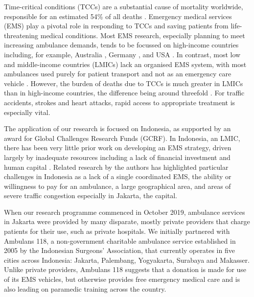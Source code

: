 \documentclass[preprint,12pt]{elsarticle}
\begin{document}
Time-critical conditions (TCCs) are a substantial cause of mortality worldwide,
responsible for an estimated 54\% of all deaths \cite{FraserBMJ}. Emergency
medical services (EMS) play a pivotal role in responding to TCCs and saving
patients from life-threatening medical conditions. Most EMS research, especially
planning to meet increasing ambulance demands, tends to be focussed on
high-income countries including, for example, Australia
\cite{lowthian2011increasing}, Germany \cite{veser2015demographic}, and USA
\cite{birmingham2021trends}. In contrast, most low and middle-income countries
(LMICs) lack an organised EMS system, with most ambulances used purely for
patient transport and not as an emergency care vehicle \cite{plummer2017ems}.
However, the burden of deaths due to TCCs is much greater in LMICs than in
high-income countries, the difference being around threefold \cite{ChangPMC}.
For traffic accidents, strokes and heart attacks, rapid access to appropriate
treatment is especially vital. 

The application of our research is focused on Indonesia, as supported by an
award for Global Challenges Research Funds (GCRF). In Indonesia, an LMIC, there
has been very little prior work on developing an EMS strategy, driven largely by
inadequate resources including a lack of financial investment and human capital
\cite{plummer2017ems,pusponegoro2003terrorism,yusvirazi2018state}. Related
research by the authors \cite{BriceSyaribahNoor2022Esui} has highlighted
particular challenges in Indonesia as a lack of a single coordinated EMS, the
ability or willingness to pay for an ambulance, a large geographical area, and
areas of severe traffic congestion especially in Jakarta, the capital.  

When our research programme commenced in October 2019, ambulance services in
Jakarta were provided by many disparate, mostly private providers that charge
patients for their use, such as private hospitals. We initially partnered with
Ambulans 118, a non-government charitable ambulance service established in 2005
by the Indonesian Surgeons’ Association, that  currently operates in five cities
across Indonesia: Jakarta, Palembang, Yogyakarta, Surabaya and Makasser. Unlike
private providers, Ambulans 118 suggests that a donation is made for use of its
EMS vehicles, but otherwise provides free emergency medical care and is also
leading on paramedic training across the country. 
\end{document}
